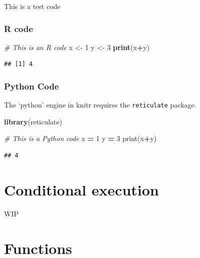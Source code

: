 \documentclass[]{book}
\newenvironment{Shaded}{\begin{snugshade}}{\end{snugshade}}
\newcommand{\BuiltInTok}[1]{#1}
\newcommand{\CommentTok}[1]{\textcolor[rgb]{0.56,0.35,0.01}{\textit{#1}}}
\newcommand{\DecValTok}[1]{\textcolor[rgb]{0.00,0.00,0.81}{#1}}
\newcommand{\KeywordTok}[1]{\textcolor[rgb]{0.13,0.29,0.53}{\textbf{#1}}}
\newcommand{\NormalTok}[1]{#1}
\newcommand{\OperatorTok}[1]{\textcolor[rgb]{0.81,0.36,0.00}{\textbf{#1}}}
\newcommand{\StringTok}[1]{\textcolor[rgb]{0.31,0.60,0.02}{#1}}
\begin{document}
This is a test code

\hypertarget{r-code}{%
\subsection{R code}\label{r-code}}

\begin{Shaded}
\begin{Highlighting}[]
\CommentTok{# This is an R code}
\NormalTok{x <-}\StringTok{ }\DecValTok{1}
\NormalTok{y <-}\StringTok{ }\DecValTok{3}
\KeywordTok{print}\NormalTok{(x}\OperatorTok{+}\NormalTok{y)}
\end{Highlighting}
\end{Shaded}

\begin{verbatim}
## [1] 4
\end{verbatim}

\hypertarget{python-code}{%
\subsection{Python Code}\label{python-code}}

The `python' engine in knitr requires the \texttt{reticulate} package.

\begin{Shaded}
\begin{Highlighting}[]
\KeywordTok{library}\NormalTok{(reticulate)}
\end{Highlighting}
\end{Shaded}

\begin{Shaded}
\begin{Highlighting}[]
\CommentTok{# This is a Python code}
\NormalTok{x }\OperatorTok{=} \DecValTok{1}
\NormalTok{y }\OperatorTok{=} \DecValTok{3}
\BuiltInTok{print}\NormalTok{(x}\OperatorTok{+}\NormalTok{y)}
\end{Highlighting}
\end{Shaded}

\begin{verbatim}
## 4
\end{verbatim}

\hypertarget{conditional-execution}{%
\chapter{Conditional execution}\label{conditional-execution}}

WIP

\hypertarget{functions}{%
\chapter{Functions}\label{functions}}
\end{document}
